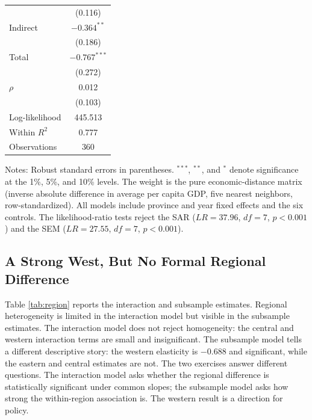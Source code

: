 \documentclass[economies,article,submit,moreauthors]{Definitions/mdpi}
\begin{document}
\begin{table}[H]
\begin{threeparttable}
\begin{tabular*}{0.62\textwidth}{@{\extracolsep{\fill}}lc}
 & (0.116)\\
Indirect & $-0.364^{**}$\\
 & (0.186)\\
Total & $-0.767^{***}$\\
 & (0.272)\\
\midrule
$\rho$ & 0.012\\
 & (0.103)\\
Log-likelihood & 445.513\\
Within $R^2$ & 0.777\\
Observations & 360\\
\bottomrule
\end{tabular*}
\begin{tablenotes}\footnotesize
\item Notes: Robust standard errors in parentheses. $^{***}$, $^{**}$, and $^{*}$ denote significance at the 1\%, 5\%, and 10\% levels. The weight is the pure economic-distance matrix (inverse absolute difference in average per capita GDP, five nearest neighbors, row-standardized). All models include province and year fixed effects and the six controls. The likelihood-ratio tests reject the SAR ($LR=37.96$, $df=7$, $p<0.001$) and the SEM ($LR=27.55$, $df=7$, $p<0.001$).
\end{tablenotes}
\end{threeparttable}
\end{table}

\subsection{A Strong West, But No Formal Regional Difference}

Table \ref{tab:region} reports the interaction and subsample estimates. Regional heterogeneity is limited in the interaction model but visible in the subsample estimates. The interaction model does not reject homogeneity: the central and western interaction terms are small and insignificant. The subsample model tells a different descriptive story: the western elasticity is $-0.688$ and significant, while the eastern and central estimates are not. The two exercises answer different questions. The interaction model asks whether the regional difference is statistically significant under common slopes; the subsample model asks how strong the within-region association is. The western result is a direction for policy.
\end{document}
